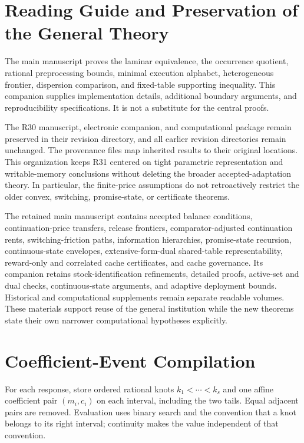 \section{Reading Guide and Preservation of the General Theory}\label{ec:guide}
The main manuscript proves the laminar equivalence, the occurrence quotient, rational preprocessing bounds, minimal execution alphabet, heterogeneous frontier, dispersion comparison, and fixed-table supporting inequality. This companion supplies implementation details, additional boundary arguments, and reproducibility specifications. It is not a substitute for the central proofs.

The R30 manuscript, electronic companion, and computational package remain preserved in their revision directory, and all earlier revision directories remain unchanged. The provenance files map inherited results to their original locations. This organization keeps R31 centered on tight parametric representation and writable-memory conclusions without deleting the broader accepted-adaptation theory. In particular, the finite-price assumptions do not retroactively restrict the older convex, switching, promise-state, or certificate theorems.

The retained main manuscript contains accepted balance conditions, continuation-price transfers, release frontiers, comparator-adjusted continuation rents, switching-friction paths, information hierarchies, promise-state recursion, continuous-state envelopes, extensive-form-dual shared-table representability, reward-only and correlated cache certificates, and cache governance. Its companion retains stock-identification refinements, detailed proofs, active-set and dual checks, continuous-state arguments, and adaptive deployment bounds. Historical and computational supplements remain separate readable volumes. These materials support reuse of the general institution while the new theorems state their own narrower computational hypotheses explicitly.

\section{Coefficient-Event Compilation}\label{ec:events}
For each response, store ordered rational knots $k_1<\cdots<k_s$ and one affine coefficient pair $(m_i,c_i)$ on each interval, including the two tails. Equal adjacent pairs are removed. Evaluation uses binary search and the convention that a knot belongs to its right interval; continuity makes the value independent of that convention.

